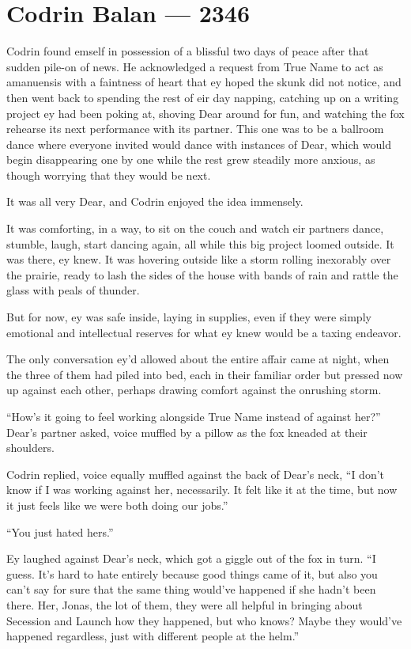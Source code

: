 \hypertarget{codrin-balan-2346}{%
\chapter{Codrin Balan — 2346}\label{codrin-balan-2346}}

Codrin found emself in possession of a blissful two days of peace after that sudden pile-on of news. He acknowledged a request from True Name to act as amanuensis with a faintness of heart that ey hoped the skunk did not notice, and then went back to spending the rest of eir day napping, catching up on a writing project ey had been poking at, shoving Dear around for fun, and watching the fox rehearse its next performance with its partner. This one was to be a ballroom dance where everyone invited would dance with instances of Dear, which would begin disappearing one by one while the rest grew steadily more anxious, as though worrying that they would be next.

It was all very Dear, and Codrin enjoyed the idea immensely.

It was comforting, in a way, to sit on the couch and watch eir partners dance, stumble, laugh, start dancing again, all while this big project loomed outside. It was there, ey knew. It was hovering outside like a storm rolling inexorably over the prairie, ready to lash the sides of the house with bands of rain and rattle the glass with peals of thunder.

But for now, ey was safe inside, laying in supplies, even if they were simply emotional and intellectual reserves for what ey knew would be a taxing endeavor.

The only conversation ey'd allowed about the entire affair came at night, when the three of them had piled into bed, each in their familiar order but pressed now up against each other, perhaps drawing comfort against the onrushing storm.

``How's it going to feel working alongside True Name instead of against her?'' Dear's partner asked, voice muffled by a pillow as the fox kneaded at their shoulders.

Codrin replied, voice equally muffled against the back of Dear's neck, ``I don't know if I was working against her, necessarily. It felt like it at the time, but now it just feels like we were both doing our jobs.''

``You just hated hers.''

Ey laughed against Dear's neck, which got a giggle out of the fox in turn. ``I guess. It's hard to hate entirely because good things came of it, but also you can't say for sure that the same thing would've happened if she hadn't been there. Her, Jonas, the lot of them, they were all helpful in bringing about Secession and Launch how they happened, but who knows? Maybe they would've happened regardless, just with different people at the helm.''

